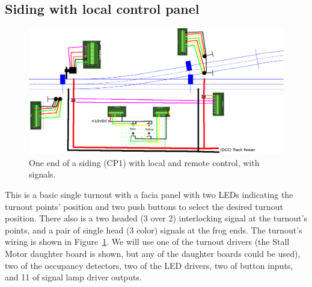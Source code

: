 \documentclass[12pt,twoside]{article}
\begin{document}
\subsection{Siding with local control panel}
\label{sect-appl:siding}
\begin{figure}[hbpt]\begin{centering}%
\includegraphics[width=5in]{ExampleSidingCP1-Wiring.png}
\caption{One end of a siding (CP1) with local and remote control, with 
signals.}
\label{fig:ExampleSidingCP1-Wiring}
\end{centering}\end{figure}

This is a basic single turnout with a facia panel with two LEDs indicating the
turnout points' position and two push buttons to select the desired turnout
position. There also is a two headed (3 over 2) interlocking signal at the
turnout's points, and a pair of single head (3 color) signals at the frog
ends. The turnout's wiring is shown in 
Figure~\ref{fig:ExampleSidingCP1-Wiring}. We will use one of the turnout 
drivers (the Stall Motor daughter board is shown, but any of the daughter 
boards could be used), two of the occupancy detectors, two of the LED drivers, 
two of button inputs, and 11 of signal lamp driver outputs.
\end{document}
